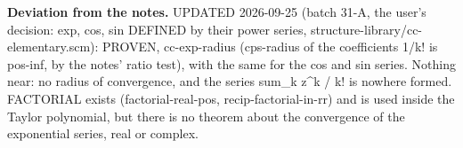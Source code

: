 %
\noindent\textbf{Deviation from the notes.} UPDATED 2026-09-25 (batch 31-A, the user's decision: exp, cos, sin DEFINED by their power series, structure-library/cc-elementary.scm): PROVEN, cc-exp-radius (cps-radius of the coefficients 1/k! is pos-inf, by the notes' ratio test), with the same for the cos and sin series. Nothing near: no radius of convergence, and the series sum\_k z\textasciicircum{}k / k! is nowhere formed. FACTORIAL exists (factorial-real-pos, recip-factorial-in-rr) and is used inside the Taylor polynomial, but there is no theorem about the convergence of the exponential series, real or complex.
%
\renewcommand{\thethm}{2.17}
\begin{prop}\label{thm:cc-exp-add}
%
\leavevmode
{}
%
\end{prop}
%
